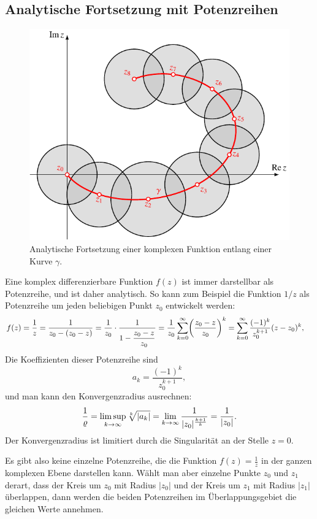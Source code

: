 \subsection{Analytische Fortsetzung mit Potenzreihen}
\begin{figure}
\centering
\includegraphics{chapters/080-funktionentheorie/images/forts.pdf}
\caption{Analytische Fortsetzung einer komplexen Funktion entlang einer
Kurve $\gamma$.
\label{komplex:fortsetzung}}
\end{figure}
Eine komplex differenzierbare Funktion $f(z)$ ist immer darstellbar als
Potenzreihe, und ist daher analytisch.
So kann zum Beispiel die Funktion $1/z$ als Potenzreihe um jeden
beliebigen Punkt $z_0$ entwickelt werden:
\begin{align}
f(z)
&=
\frac1z
=
\frac1{z_0-(z_0-z)}
=
\frac1{z_0}\cdot
\frac1{1-\displaystyle\frac{z_0-z\mathstrut}{z_0\mathstrut}}
=
\frac1{z_0}\sum_{k=0}^{\infty} \biggl(\frac{z_0-z\mathstrut}{z_0\mathstrut}\biggr)^k
=
\sum_{k=0}^{\infty} \frac{(-1)^k}{z_0^{k+1}} (z-z_0)^k,
\label{komplex:1durchreihe}
\end{align}
Die Koeffizienten dieser Potenzreihe sind
\[
a_k=\frac{(-1)^k}{z_0^{k+1}},
\]
und man kann den Konvergenzradius ausrechnen:
\[
\frac1{\varrho}
=
\limsup_{k\to\infty} \root{k}\of{|a_k|} = \lim_{k\to\infty}\frac1{|z_0|^{\frac{k+1}{k}}}
=
\frac1{|z_0|}.
\]
Der Konvergenzradius ist limitiert durch die Singularität an der Stelle
$z=0$.

Es gibt also keine einzelne Potenzreihe, die die Funktion $f(z)=\frac1z$ in der
ganzen komplexen Ebene darstellen kann.
Wählt man aber einzelne Punkte $z_0$ und $z_1$ derart, dass der Kreis
um $z_0$ mit Radius $|z_0|$ und der Kreis um $z_1$ mit Radius $|z_1|$
überlappen, dann werden die beiden Potenzreihen im Überlappungsgebiet
die gleichen Werte annehmen.

